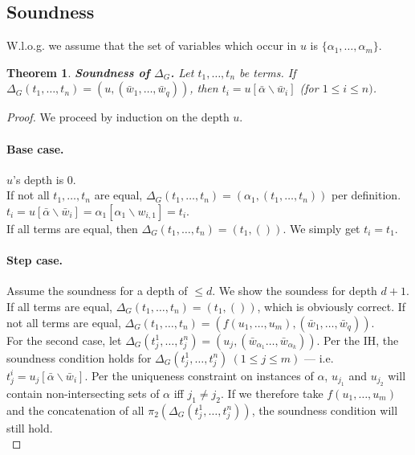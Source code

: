\documentclass[a4paper, 11pt]{report}
\newtheorem{theorem}{Theorem}
\begin{document}
\subsection{Soundness}

W.l.o.g. we assume that the set of variables which occur in $u$ is $\{\alpha_1,\dots,\alpha_m\}$.

\begin{theorem}
\textbf{Soundness of $\Delta_G$.}
Let $t_1,\dots,t_n$ be terms. If $\Delta_G(t_1,\dots,t_n) = (u,(\bar{w}_1,\dots,\bar{w}_q))$, then $t_i = u[\bar{\alpha}\backslash\bar{w}_i]$ (for $1\leq i \leq n)$.
\label{thm:DeltaGSoundness}
\end{theorem}

\begin{proof} We proceed by induction on the depth $u$.
\paragraph{Base case.} $u$'s depth is 0.\\
If not all $t_1,\dots,t_n$ are equal, $\Delta_G(t_1,\dots,t_n) = \left(\alpha_1,(t_1,\dots,t_n)\right)$ per definition.
$t_i = u[\bar{\alpha}\backslash \bar{w}_i] = \alpha_1[\alpha_1\backslash w_{i,1}] = t_i$.\\
If all terms are equal, then $\Delta_G(t_1,\dots,t_n) = (t_1,())$. We simply get $t_i = t_1$.


\paragraph{Step case.} Assume the soundness for a depth of $\leq d$. We show the soundess for depth $d+1$.\\

\noindent
If all terms are equal, $\Delta_G(t_1,\dots,t_n) = (t_1,())$, which is obviously correct.
If not all terms are equal, $\Delta_G(t_1,\dots,t_n) = (f(u_1,\dots,u_m), (\bar{w}_1,\dots,\bar{w}_q))$.\\

\noindent
For the second case, let $\Delta_G(t_j^1,\dots,t_j^n) = (u_j,(\bar{w}_{\alpha_1}\dots,\bar{w}_{\alpha_k}))$. Per the IH, the soundness condition holds for $\Delta_G(t_j^1,\dots,t_j^n)\ (1\leq j\leq m)$ --- i.e. $t_j^i = u_j[\bar{\alpha}\backslash \bar{w}_i]$. Per the uniqueness constraint on instances of $\alpha$, $u_{j_1}$ and $u_{j_2}$ will contain non-intersecting sets of $\alpha$ iff $j_1 \neq j_2$. If we therefore take $f(u_1,\dots,u_m)$ and the concatenation of all $\pi_2(\Delta_G(t_j^1,\dots,t_j^n))$, the soundness condition will still hold.\\


\end{proof}
\end{document}
